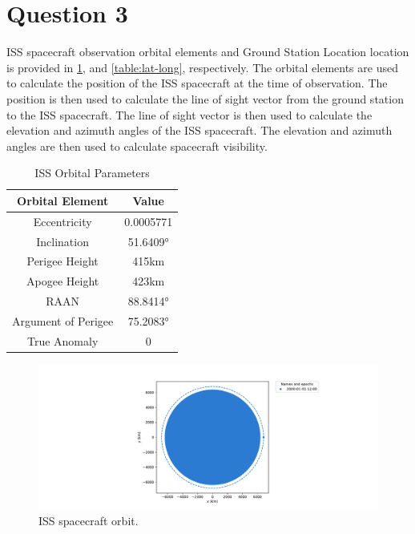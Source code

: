 \section{Question 3} 
ISS spacecraft observation orbital elements and Ground Station Location location is provided in \ref{table:orbital-elements}, and \ref{table:lat-long}, respectively. The orbital elements are used to calculate the position of the ISS spacecraft at the time of observation. The position is then used to calculate the line of sight vector from the ground station to the ISS spacecraft. The line of sight vector is then used to calculate the elevation and azimuth angles of the ISS spacecraft. The elevation and azimuth angles are then used to calculate spacecraft visibility.
\begin{table}[H]
    \centering
    \label{table:orbital-elements}
    \Tstrut
    \begin{tabular}{|c|c|}
    \hline
    Orbital Element & Value \\
    \hline
    Eccentricity & 0.0005771 \\
    Inclination & \ang{51.6409} \\
    Perigee Height & 415km \\
    Apogee Height & 423km \\
    RAAN & \ang{88.8414} \\
    Argument of Perigee & \ang{75.2083} \\
    True Anomaly & 0 \\
    \hline
    \end{tabular}
    \caption{ISS Orbital Parameters}
\end{table}

\begin{figure}[H]
    \centering
    \includegraphics[width=1\textwidth]{../Figure/Q3/orbiral}
    \caption{ISS spacecraft orbit.}
    \label{fig:ISS_orbit}
\end{figure}

